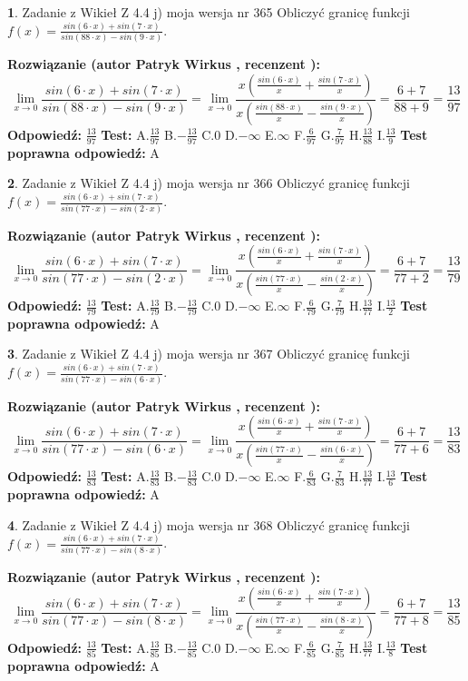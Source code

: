 \documentclass[12pt, a4paper]{article}
\theoremstyle{definition} %
\newtheorem{zad}{}
\newcommand{\zadStart}[1]{\begin{zad}#1\newline}
\newcommand{\zadStop}{\end{zad}}
\newcommand{\rozwStart}[2]{\noindent \textbf{Rozwiązanie (autor #1 , recenzent #2): }\newline}
\newcommand{\rozwStop}{\newline}
\newcommand{\odpStart}{\noindent \textbf{Odpowiedź:}\newline}
\newcommand{\odpStop}{\newline}
\newcommand{\testStart}{\noindent \textbf{Test:}\newline}
\newcommand{\testStop}{\newline}
\newcommand{\kluczStart}{\noindent \textbf{Test poprawna odpowiedź:}\newline}
\newcommand{\kluczStop}{\newline}
\begin{document}
\zadStart{Zadanie z Wikieł Z 4.4 j) moja wersja nr 365}
Obliczyć granicę funkcji $f(x)=\frac{sin(6\cdot x) +sin(7\cdot x)}{sin(88\cdot x) -sin(9\cdot x)}$.
\zadStop
\rozwStart{Patryk Wirkus}{}
$$\lim\limits_{x\to 0}\frac{sin(6\cdot x) +sin(7\cdot x)}{sin(88\cdot x) -sin(9\cdot x)}=\lim\limits_{x\to 0}\frac{x(\frac{sin(6\cdot x)}{x}+\frac{sin(7\cdot x)}{x})}{x(\frac{sin(88\cdot x)}{x}-\frac{sin(9\cdot x)}{x})}=\frac{6+7}{88+9} = \frac{13}{97}$$
\rozwStop
\odpStart
$\frac{13}{97}$
\odpStop
\testStart
A.$\frac{13}{97}$
B.$-\frac{13}{97}$
C.$0$
D.$-\infty$
E.$\infty$
F.$\frac{6}{97}$
G.$\frac{7}{97}$
H.$\frac{13}{88}$
I.$\frac{13}{9}$
\testStop
\kluczStart
A
\kluczStop



\zadStart{Zadanie z Wikieł Z 4.4 j) moja wersja nr 366}
Obliczyć granicę funkcji $f(x)=\frac{sin(6\cdot x) +sin(7\cdot x)}{sin(77\cdot x) -sin(2\cdot x)}$.
\zadStop
\rozwStart{Patryk Wirkus}{}
$$\lim\limits_{x\to 0}\frac{sin(6\cdot x) +sin(7\cdot x)}{sin(77\cdot x) -sin(2\cdot x)}=\lim\limits_{x\to 0}\frac{x(\frac{sin(6\cdot x)}{x}+\frac{sin(7\cdot x)}{x})}{x(\frac{sin(77\cdot x)}{x}-\frac{sin(2\cdot x)}{x})}=\frac{6+7}{77+2} = \frac{13}{79}$$
\rozwStop
\odpStart
$\frac{13}{79}$
\odpStop
\testStart
A.$\frac{13}{79}$
B.$-\frac{13}{79}$
C.$0$
D.$-\infty$
E.$\infty$
F.$\frac{6}{79}$
G.$\frac{7}{79}$
H.$\frac{13}{77}$
I.$\frac{13}{2}$
\testStop
\kluczStart
A
\kluczStop



\zadStart{Zadanie z Wikieł Z 4.4 j) moja wersja nr 367}
Obliczyć granicę funkcji $f(x)=\frac{sin(6\cdot x) +sin(7\cdot x)}{sin(77\cdot x) -sin(6\cdot x)}$.
\zadStop
\rozwStart{Patryk Wirkus}{}
$$\lim\limits_{x\to 0}\frac{sin(6\cdot x) +sin(7\cdot x)}{sin(77\cdot x) -sin(6\cdot x)}=\lim\limits_{x\to 0}\frac{x(\frac{sin(6\cdot x)}{x}+\frac{sin(7\cdot x)}{x})}{x(\frac{sin(77\cdot x)}{x}-\frac{sin(6\cdot x)}{x})}=\frac{6+7}{77+6} = \frac{13}{83}$$
\rozwStop
\odpStart
$\frac{13}{83}$
\odpStop
\testStart
A.$\frac{13}{83}$
B.$-\frac{13}{83}$
C.$0$
D.$-\infty$
E.$\infty$
F.$\frac{6}{83}$
G.$\frac{7}{83}$
H.$\frac{13}{77}$
I.$\frac{13}{6}$
\testStop
\kluczStart
A
\kluczStop



\zadStart{Zadanie z Wikieł Z 4.4 j) moja wersja nr 368}
Obliczyć granicę funkcji $f(x)=\frac{sin(6\cdot x) +sin(7\cdot x)}{sin(77\cdot x) -sin(8\cdot x)}$.
\zadStop
\rozwStart{Patryk Wirkus}{}
$$\lim\limits_{x\to 0}\frac{sin(6\cdot x) +sin(7\cdot x)}{sin(77\cdot x) -sin(8\cdot x)}=\lim\limits_{x\to 0}\frac{x(\frac{sin(6\cdot x)}{x}+\frac{sin(7\cdot x)}{x})}{x(\frac{sin(77\cdot x)}{x}-\frac{sin(8\cdot x)}{x})}=\frac{6+7}{77+8} = \frac{13}{85}$$
\rozwStop
\odpStart
$\frac{13}{85}$
\odpStop
\testStart
A.$\frac{13}{85}$
B.$-\frac{13}{85}$
C.$0$
D.$-\infty$
E.$\infty$
F.$\frac{6}{85}$
G.$\frac{7}{85}$
H.$\frac{13}{77}$
I.$\frac{13}{8}$
\testStop
\kluczStart
A
\kluczStop
\end{document}
